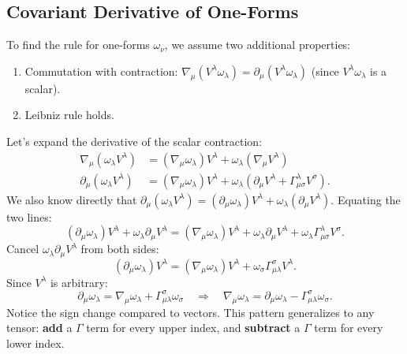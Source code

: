 \documentclass[11pt, a4paper]{report}
\begin{document}
\subsection*{Covariant Derivative of One-Forms}
To find the rule for one-forms \(\omega_\nu\), we assume two additional properties:
\begin{enumerate}
    \item Commutation with contraction: \(\nabla_\mu (V^\lambda \omega_\lambda) = \partial_\mu (V^\lambda \omega_\lambda)\) (since \(V^\lambda \omega_\lambda\) is a scalar).
    \item Leibniz rule holds.
\end{enumerate}
Let's expand the derivative of the scalar contraction:
\begin{align}
\nabla_\mu (\omega_\lambda V^\lambda) &= (\nabla_\mu \omega_\lambda) V^\lambda + \omega_\lambda (\nabla_\mu V^\lambda) \\
\partial_\mu (\omega_\lambda V^\lambda) &= (\nabla_\mu \omega_\lambda) V^\lambda + \omega_\lambda (\partial_\mu V^\lambda + \Gamma^\lambda_{\mu\sigma} V^\sigma).
\end{align}
We also know directly that \(\partial_\mu (\omega_\lambda V^\lambda) = (\partial_\mu \omega_\lambda) V^\lambda + \omega_\lambda (\partial_\mu V^\lambda)\). Equating the two lines:
\begin{equation}
(\partial_\mu \omega_\lambda) V^\lambda + \omega_\lambda \partial_\mu V^\lambda = (\nabla_\mu \omega_\lambda) V^\lambda + \omega_\lambda \partial_\mu V^\lambda + \omega_\lambda \Gamma^\lambda_{\mu\sigma} V^\sigma.
\end{equation}
Cancel \(\omega_\lambda \partial_\mu V^\lambda\) from both sides:
\begin{equation}
(\partial_\mu \omega_\lambda) V^\lambda = (\nabla_\mu \omega_\lambda) V^\lambda + \omega_\sigma \Gamma^\sigma_{\mu\lambda} V^\lambda.
\end{equation}
Since \(V^\lambda\) is arbitrary:
\begin{equation}
\partial_\mu \omega_\lambda = \nabla_\mu \omega_\lambda + \Gamma^\sigma_{\mu\lambda} \omega_\sigma \quad \Longrightarrow \quad \nabla_\mu \omega_\lambda = \partial_\mu \omega_\lambda - \Gamma^\sigma_{\mu\lambda} \omega_\sigma.
\end{equation}
Notice the sign change compared to vectors. This pattern generalizes to any tensor: \textbf{add} a \(\Gamma\) term for every upper index, and \textbf{subtract} a \(\Gamma\) term for every lower index.
\end{document}

